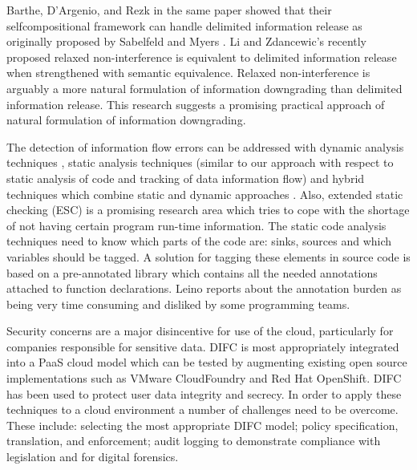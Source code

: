 Barthe, D'Argenio, and Rezk in the same paper showed that their selfcompositional framework can handle delimited information release as originally proposed by Sabelfeld and Myers \cite{ref_72_sabelfeld2004model}. Li and Zdancewic's
recently proposed relaxed non-interference \cite{ref_73_li2005downgrading} is equivalent to delimited information release when strengthened with semantic equivalence. Relaxed non-interference is arguably a more natural formulation of information downgrading than delimited
information release. This research suggests a promising practical approach of natural formulation of information downgrading.


The detection of information flow errors can be
addressed with dynamic analysis techniques \cite{ref_44_avgerinos:aeg,ref_43_fenton:memoryless,ref_42_sabelfeld:dynamic},
static analysis techniques \cite{ref_41_guarnieri:security,ref_40_myers:jflow,ref_39_simonet:report,ref_38_volpano:sound,ref_37_xiao:transparent} (similar
to our approach with respect to static analysis of code and
tracking of data information flow) and hybrid techniques which
combine static and dynamic approaches \cite{ref_36_moore:static}. Also, extended
static checking \cite{ref_35_david:extended} (ESC) is a promising research area which
tries to cope with the shortage of not having certain program
run-time information.
The static code analysis techniques need to know which
parts of the code are: sinks, sources and which variables
should be tagged. A solution for tagging these elements in
source code is based on a pre-annotated library which contains
all the needed annotations attached to function declarations.
Leino \cite{ref_34_leino:10years} reports about the annotation burden as being very
time consuming and disliked by some programming teams.

Security concerns are a major disincentive for use of the
cloud, particularly for companies responsible for sensitive
data. DIFC \cite{ref_74_bacon2014information} is most appropriately integrated into a PaaS cloud model which can be tested by augmenting
existing open source implementations such as VMware CloudFoundry
and Red Hat OpenShift. DIFC has been used to protect user
data integrity and secrecy. In order to apply these techniques
to a cloud environment a number of challenges need to be
overcome. These include: selecting the most appropriate DIFC
model; policy specification, translation, and enforcement; audit
logging to demonstrate compliance with legislation and for
digital forensics.

